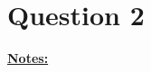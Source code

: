 \documentclass[12pt]{article}
\begin{document}














\section*{Question 2}

\bigskip

\underline{\textbf{Notes:}}

\bigskip
\end{document}
